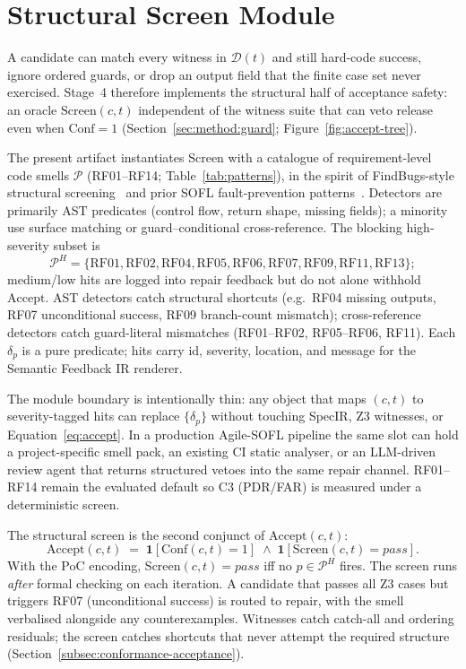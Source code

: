 \section{Structural Screen Module}
\label{sec:impl:patterns}

A candidate can match every witness in $\mathcal{D}(t)$ and still hard-code
success, ignore ordered guards, or drop an output field that the finite case
set never exercised.
Stage~4 therefore implements the structural half of acceptance safety: an
oracle $\mathrm{Screen}(c,t)$ independent of the witness suite that can veto
release even when $\mathrm{Conf}{=}1$
(Section~\ref{sec:method:guard}; Figure~\ref{fig:accept-tree}).

The present artifact instantiates $\mathrm{Screen}$ with a catalogue of
requirement-level code smells $\mathcal{P}$ (RF01--RF14;
Table~\ref{tab:patterns}), in the spirit of FindBugs-style structural
screening~\citep{hovemeyer2004findbugs,ayewah2007findbugs} and prior SOFL
fault-prevention patterns~\citep{li2023iet_faultprevention}.
Detectors are primarily AST predicates (control flow, return shape, missing
fields); a minority use surface matching or guard--conditional
cross-reference.
The blocking high-severity subset is
\[
  \mathcal{P}^H = \{\text{RF01}, \text{RF02}, \text{RF04}, \text{RF05},
    \text{RF06}, \text{RF07}, \text{RF09}, \text{RF11}, \text{RF13}\};
\]
medium/low hits are logged into repair feedback but do not alone withhold
$\mathrm{Accept}$.
AST detectors catch structural shortcuts (e.g.\ RF04 missing outputs, RF07
unconditional success, RF09 branch-count mismatch); cross-reference
detectors catch guard-literal mismatches (RF01--RF02, RF05--RF06, RF11).
Each $\delta_p$ is a pure predicate; hits carry id, severity, location, and
message for the Semantic Feedback IR renderer.

The module boundary is intentionally thin: any object that maps $(c,t)$ to
severity-tagged hits can replace $\{\delta_p\}$ without touching SpecIR, Z3
witnesses, or Equation~\eqref{eq:accept}.
In a production Agile-SOFL pipeline the same slot can hold a project-specific
smell pack, an existing CI static analyser, or an LLM-driven review agent that
returns structured vetoes into the same repair channel.
RF01--RF14 remain the evaluated default so C3 (PDR/FAR) is measured under a
deterministic screen.

The structural screen is the second conjunct of $\mathrm{Accept}(c,t)$:
\[
  \mathrm{Accept}(c, t)
  \;=\;
  \mathbf{1}\!\left[\mathrm{Conf}(c, t) = 1\right]
  \;\land\;
  \mathbf{1}\!\left[\mathrm{Screen}(c, t) = \mathit{pass}\right].
\]
With the PoC encoding,
$\mathrm{Screen}(c,t)=\mathit{pass}$ iff no $p\in\mathcal{P}^H$ fires.
The screen runs \emph{after} formal checking on each iteration.
A candidate that passes all Z3 cases but triggers RF07 (unconditional
success) is routed to repair, with the smell verbalised alongside any
counterexamples.
Witnesses catch catch-all and ordering residuals; the screen catches
shortcuts that never attempt the required structure
(Section~\ref{subsec:conformance-acceptance}).

